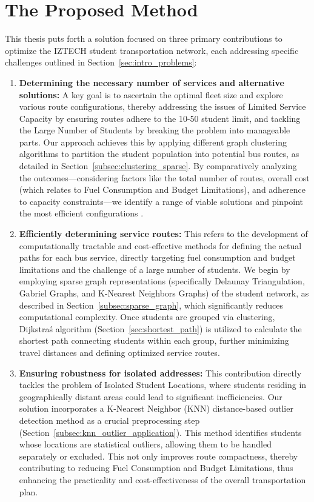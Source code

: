 \section{The Proposed Method}
\label{sec:intro_solution}
This thesis puts forth a solution focused on three primary contributions to optimize the IZTECH student transportation network, each addressing specific challenges outlined in Section~\ref{sec:intro_problems}:

\begin{enumerate}
    \item \textbf{Determining the necessary number of services and alternative solutions:} A key goal is to ascertain the optimal fleet size and explore various route configurations, thereby addressing the issues of Limited Service Capacity by ensuring routes adhere to the 10-50 student limit, and tackling the Large Number of Students by breaking the problem into manageable parts. Our approach achieves this by applying different graph clustering algorithms to partition the student population into potential bus routes, as detailed in Section~\ref{subsec:clustering_sparse}. By comparatively analyzing the outcomes—considering factors like the total number of routes, overall cost (which relates to Fuel Consumption and Budget Limitations), and adherence to capacity constraints—we identify a range of viable solutions and pinpoint the most efficient configurations \cite{zhang2018data}.
    
    \item \textbf{Efficiently determining service routes:} This refers to the development of computationally tractable and cost-effective methods for defining the actual paths for each bus service, directly targeting fuel consumption and budget limitations and the challenge of a large number of students. We begin by employing sparse graph representations (specifically Delaunay Triangulation, Gabriel Graphs, and K-Nearest Neighbors Graphs) of the student network, as described in Section~\ref{subsec:sparse_graph}, which significantly reduces computational complexity. Once students are grouped via clustering, Dijkstra\'s algorithm (Section~\ref{sec:shortest_path}) is utilized to calculate the shortest path connecting students within each group, further minimizing travel distances and defining optimized service routes.
    
    \item \textbf{Ensuring robustness for isolated addresses:} This contribution directly tackles the problem of Isolated Student Locations, where students residing in geographically distant areas could lead to significant inefficiencies. Our solution incorporates a K-Nearest Neighbor (KNN) distance-based outlier detection method as a crucial preprocessing step (Section~\ref{subsec:knn_outlier_application}). This method identifies students whose locations are statistical outliers, allowing them to be handled separately or excluded. This not only improves route compactness, thereby contributing to reducing Fuel Consumption and Budget Limitations, thus enhancing the practicality and cost-effectiveness of the overall transportation plan.
\end{enumerate}


